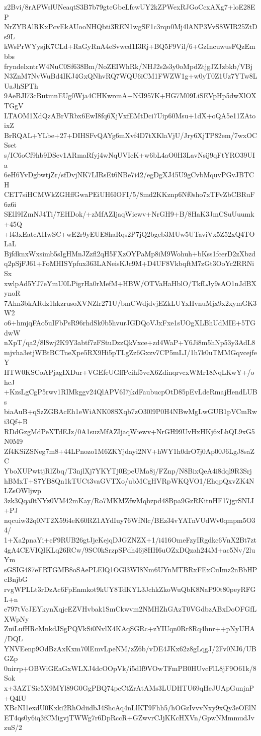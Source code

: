 z2Bvi/8rAFWslUNeaqtS3B7b79gtcGbeLfcwUY2kZPWexRJGoCcxAXg7+loE28EP
NrZYBAlRKxPcvEkAUooNHQbti3REN1wgSF1c3rqn0Mj4lANP3VvS8WIR25ZtDs9L
kWsPrWYysjK7CLd+RaGyRnA4eSvwcd1I3Rj+BQ5F9Vil/6+GzIncuwusFQzEmbbs
fryndelxntrW4NuC0Sf638Bm/NoZEIWhRk/NHJ2s2s3y0oMpdZtjgJZJzbkb/VBj
N3ZnM7NvWuBd4IKJ4GxQNhvRQ7WQU6iCM1FWZW1g+w0yT0Z1Uz7YTw8LUaJhSPTh
9AeBJl73cButmnEUg0Wja4CHKwrcnA+NfJ957K+HG7M09LiSEVpHp5dwXlOXTGgV
LTAOM1XdQzABrVRbx6EwI8fq6XjVxfEMtDci7Uip60Msu+1dX+oQA5e11ZAtoixZ
BrRQAL+YLbe+27+DIHSFvQAYg6mXvf4D7tXKlaVjU/Jry6XjTP82em/7wxOCSset
s/IC6oCf9hb9DSev1ARmaRfyj4wNqUVIcK+w6bL4aO0H3LavNsij9qFtYRO39UIa
6eH6YvDgbwtjZr/sfDvjNK7LIRsEt6NBe7i42/egDgXJ45U9gCvbMquvPGvJBTCH
CET7siHCMWkZGHffGwaPEiUH6IOFI/5/8md2KKznp6Nf0sho7xTFvZbCBRuF6z6i
SElI9IZmNJ4Ti/7EHDok/+zMfAZIjaqWiewv+NrGH9+B/8HaK3JmCSuUuumk+45Q
+l43xEatcAHwSC+wE2r9yEUE8haRqs2P7jQ2bgeb3MUw5UTaviVx5Z52xQ4TOLaL
BjfdknxWxsimb5sIgHMnJZzfl2qH5FXzOYPaMp8iM9Wohuh+bKss1fcerD2zXbzd
q2pSjFJ61+FoMHISYpfux363LANeisKJc9M+D4UF8VkbqftM7zGt3OoYc2RRNiSx
xwlpAd5YJ7eYmU0LPigrHa0rMefM+HBW/OTVaHaHblO/TkfLJy9sAO1nJdBXynoR
7Ahn3bkARdz1hkzrusoXVNZlr271U/bmCWdjdvjEZkLUYxHvnuMjx9x2xymGK3W2
o6+hmjqFAo5uIFbPsR96rhdSk0b5hvurJGDQoVJxFxe1sUOgXLBhUdMIE+5TGdwW
nXpT/qa2/8l8wj2K9Y3abtf7zFStuDzzQkVxce+zd4WaP+Y6Ji8m5hNp53y3AdL8
mjvha3etjWBtBCTneXpe5RX9Hi5pTLgZz6Gxzv7CP5mLJ/1h7k0uTMMGqvcejfeY
HTW0KSCoAPjagIXDur+VGEfeUGffPcihf5veX6ZdinqrvcxWMr18NqLKwY+/ohcJ
+KzsLgCgP5rwv1RIMkggv24QlAPV6I7jkdFaubucpOtD85pEvLdeRmajHendLUBs
biaAuB+qSzZGBAcEh1eWiANK08SXqb7zO30l9P0H4NBwMgLwGUB1pVCmRwi3Qf+B
RDdGzgMdPeXTdEJz/0A1suzMfAZIjaqWiewv+NrGH99UvHxHKj6xLhQL9xG5N0M9
Zf4KSiZSNeg7m8+44LPnozo1M6ZKYjdayi2NV+hWY1h0drO7j0Ap00J6LgJ8saZC
YboXUPwttjRlZbq/T3njlXj7YKYTj0EpeUMa8j/FZnp/N8BixQeA4i8dql9R3Srj
hBMxT+S7YB8Qn1kTUCt3vaGVTXo/ubMCgHVRpWKQVO1/EhqpQxvZK4NLZsOWljwp
3zk3Qqa0tNYz0VM42mKay/Ro7MKMZfwMqbzpd48Bpa9GzRKitnHF17jgrSNLI+PJ
nqcuiw32q0NT2X59i4eK60RZ1AYdIuy76WfNlc/BEz34vYATnVUdWv0qmpm5O34/
1+Xa2pnaYi+cF9RUB26gtJjeKejqDJGZNZX+1/i416OmeFzyIRgdkc6VnX2Bt7zt
4gA4CEVIQIKLq26RCw/9SC0kSrzpSPdh46j8HH6uOZxDQzah244M+ac5Nv/2luYm
sGSIG487eFRTGMB8oSAePLElQ1OGl3WI8Nm6UYnMTBRxFExCuImz2nBbHPcBnjbG
rvgWPLLt3rDzAc6FpEnmkot9kUY8TdKYL3JchkZkoWuQbK8NaP90t80peyRFGL+n
e797tVcJEYkynXqjeEZVHvbak1SmCkwvm2NMHZhGAzT0VGdbzABxDoOFGfLXWpNy
ZuiLufHRcMnkdJSgPQVkSi0NvlX4KAqSGRc+zYIUqn0Rr8Rq4hnr++pNyUHA/DQL
YNVEenp9OdBzAxKxm70lEmvLpeNM/zZ6b/vDE4JKx62z8gLqgJ/2Fv0NJ6/UBGZp
0nirrp+OBWiGEaGxWLXJ4dcOOpVk/i5dIf9VOwTFmPB0HUvcFlL8jF9O61k/8Sok
x+3AZTSic5X9MYl89G0GgPBQ74pcCtZrAtAMs3LUDHTU69qHeJUApGunjnP+Q4IU
XBcNI1exdU0Kxki2RhOdiidbJ4ShcAq4nLlKT9Fhh5/hOGzIvvvNxy9xQy3eOElN
ET4qs0y6iq3fCMigvjTWWg7r6DpRccR+GZwvrCJjKKcHXVn/GpwNMmmudJvzuS/2
